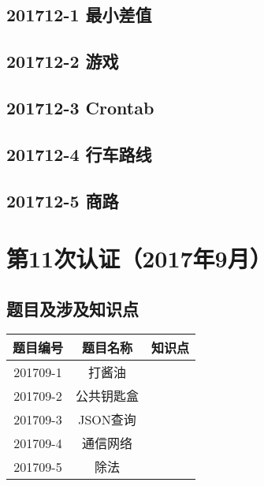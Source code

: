 \documentclass[cn,10pt,math=newtx,citestyle=gb7714-2015,bibstyle=gb7714-2015]{elegantbook}
\newif\ifonlyanalyze %
\begin{document}
\newpage
\section{201712-1 最小差值}
\ifonlyanalyze
\else
    
\fi


\newpage
\section{201712-2 游戏}
\ifonlyanalyze
\else
    
\fi


\newpage
\section{201712-3 Crontab}
\ifonlyanalyze
\else
    
\fi


\newpage
\section{201712-4 行车路线}
\ifonlyanalyze
\else
    
\fi


\newpage
\section{201712-5 商路}
\ifonlyanalyze
\else
    
\fi



\chapter{第11次认证（2017年9月）}

\section{题目及涉及知识点}

\begin{table}[htbp]
    \centering
    \begin{tabular}{ccc}
        \toprule
        题目编号 & 题目名称   & 知识点 \\
        \midrule
        201709-1 & 打酱油     &        \\
        201709-2 & 公共钥匙盒 &        \\
        201709-3 & JSON查询   &        \\
        201709-4 & 通信网络   &        \\
        201709-5 & 除法       &        \\
        \bottomrule
    \end{tabular}
\end{table}
\end{document}

